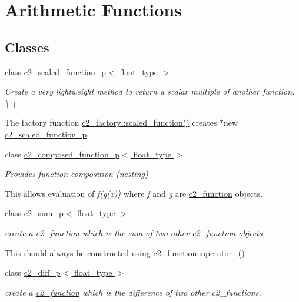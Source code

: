 \hypertarget{group__arithmetic__functions}{\section{Arithmetic Functions}
\label{group__arithmetic__functions}
}
\subsection*{Classes}
\begin{DoxyCompactItemize}
\item 
class \hyperlink{classc2__scaled__function__p}{c2\-\_\-scaled\-\_\-function\-\_\-p$<$ float\-\_\-type $>$}
\begin{DoxyCompactList}\small\item\em Create a very lightweight method to return a scalar multiple of another function. \textbackslash{} \textbackslash{}

The factory function \hyperlink{classc2__factory_a81a7b686b7ffa389ad4dcd8d18997332}{c2\-\_\-factory\-::scaled\-\_\-function()} creates $\ast$new \hyperlink{classc2__scaled__function__p}{c2\-\_\-scaled\-\_\-function\-\_\-p}. \end{DoxyCompactList}\item 
class \hyperlink{classc2__composed__function__p}{c2\-\_\-composed\-\_\-function\-\_\-p$<$ float\-\_\-type $>$}
\begin{DoxyCompactList}\small\item\em Provides function composition (nesting)

This allows evaluation of {\itshape f(g(x))} where {\itshape f} and {\itshape g} are \hyperlink{classc2__function}{c2\-\_\-function} objects. \end{DoxyCompactList}\item 
class \hyperlink{classc2__sum__p}{c2\-\_\-sum\-\_\-p$<$ float\-\_\-type $>$}
\begin{DoxyCompactList}\small\item\em create a \hyperlink{classc2__function}{c2\-\_\-function} which is the sum of two other \hyperlink{classc2__function}{c2\-\_\-function} objects.

This should always be constructed using \hyperlink{classc2__function_a268b206b47c55e635e5f0a9e0f3e8ded}{c2\-\_\-function\-::operator+()} \end{DoxyCompactList}\item 
class \hyperlink{classc2__diff__p}{c2\-\_\-diff\-\_\-p$<$ float\-\_\-type $>$}
\begin{DoxyCompactList}\small\item\em create a \hyperlink{classc2__function}{c2\-\_\-function} which is the difference of two other c2\-\_\-functions.


\end{DoxyCompactList}
\end{DoxyCompactItemize}
